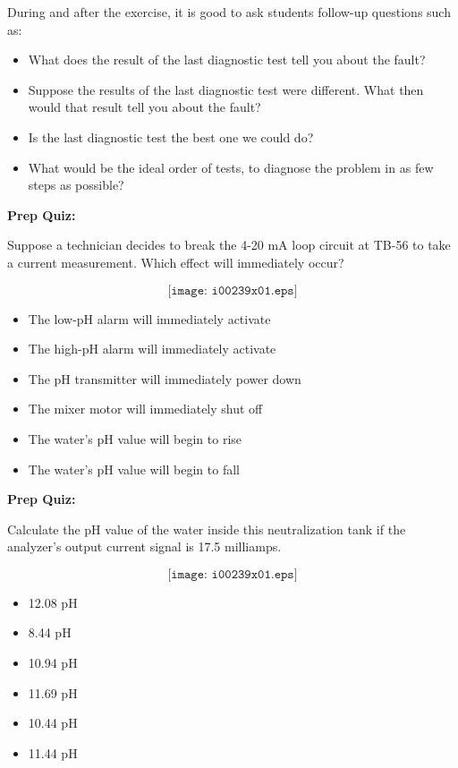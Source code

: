 During and after the exercise, it is good to ask students follow-up questions such as:

\begin{itemize}
\item{} What does the result of the last diagnostic test tell you about the fault?
\item{} Suppose the results of the last diagnostic test were different.  What then would that result tell you about the fault?
\item{} Is the last diagnostic test the best one we could do?
\item{} What would be the ideal order of tests, to diagnose the problem in as few steps as possible?
\end{itemize}


\vfil \eject

\noindent
{\bf Prep Quiz:}

Suppose a technician decides to break the 4-20 mA loop circuit at TB-56 to take a current measurement.  Which effect will immediately occur?

$$\texttt{[image: i00239x01.eps]}$$

\begin{itemize}
\item{} The low-pH alarm will immediately activate
\vskip 5pt 
\item{} The high-pH alarm will immediately activate
\vskip 5pt 
\item{} The pH transmitter will immediately power down
\vskip 5pt 
\item{} The mixer motor will immediately shut off
\vskip 5pt 
\item{} The water's pH value will begin to rise
\vskip 5pt 
\item{} The water's pH value will begin to fall
\end{itemize}


\vfil \eject

\noindent
{\bf Prep Quiz:}

Calculate the pH value of the water inside this neutralization tank if the analyzer's output current signal is 17.5 milliamps.

$$\texttt{[image: i00239x01.eps]}$$

\begin{itemize}
\item{} 12.08 pH
\vskip 5pt 
\item{} 8.44 pH
\vskip 5pt 
\item{} 10.94 pH
\vskip 5pt 
\item{} 11.69 pH
\vskip 5pt 
\item{} 10.44 pH
\vskip 5pt 
\item{} 11.44 pH
\end{itemize}




